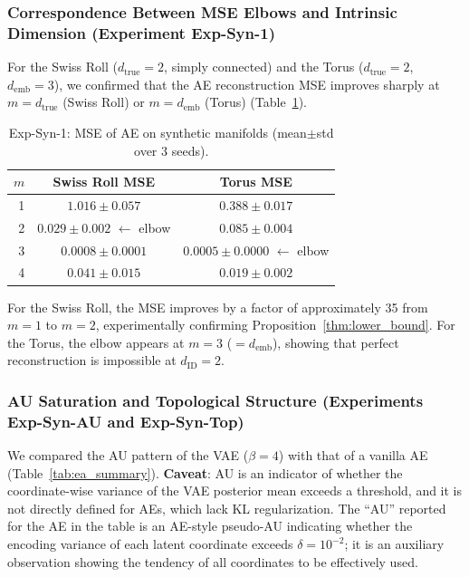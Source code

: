 \documentclass[make,article,submit,pdftex,moreauthors]{Definitions/mdpi}
\newcommand{\dID}{d_{\mathrm{ID}}}
\newcommand{\dtrue}{d_{\mathrm{true}}}
\newcommand{\demb}{d_{\mathrm{emb}}}
\begin{document}
\subsubsection{Correspondence Between MSE Elbows and Intrinsic Dimension (Experiment Exp-Syn-1)}

For the Swiss Roll ($\dtrue = 2$, simply connected) and the Torus ($\dtrue = 2$, $\demb = 3$),
we confirmed that the AE reconstruction MSE improves sharply at $m = \dtrue$ (Swiss Roll) or $m = \demb$ (Torus)
(Table~\ref{tab:e1}).

\begin{table}[H]
\centering
\caption{Exp-Syn-1: MSE of AE on synthetic manifolds (mean$\pm$std over 3 seeds).}
\label{tab:e1}
\small
\begin{tabular}{rcc}
\toprule
$m$ & Swiss Roll MSE & Torus MSE \\
\midrule
1 & $1.016\pm0.057$ & $0.388\pm0.017$ \\
2 & $\boldsymbol{0.029\pm0.002}$ $\leftarrow$ elbow & $0.085\pm0.004$ \\
3 & $0.0008\pm0.0001$ & $\boldsymbol{0.0005\pm0.0000}$ $\leftarrow$ elbow \\
4 & $0.041\pm0.015$ & $0.019\pm0.002$ \\
\bottomrule
\end{tabular}
\end{table}

For the Swiss Roll, the MSE improves by a factor of approximately 35 from $m = 1$ to $m = 2$,
experimentally confirming Proposition~\ref{thm:lower_bound}.
For the Torus, the elbow appears at $m = 3$ ($= \demb$),
showing that perfect reconstruction is impossible at $\dID = 2$.

\subsubsection{AU Saturation and Topological Structure (Experiments Exp-Syn-AU and Exp-Syn-Top)}

We compared the AU pattern of the VAE ($\beta = 4$) with that of a vanilla AE (Table~\ref{tab:ea_summary}).
\textbf{Caveat}: AU is an indicator of whether the coordinate-wise variance of the VAE posterior mean exceeds a threshold,
and it is not directly defined for AEs, which lack KL regularization.
The ``AU'' reported for the AE in the table is an AE-style pseudo-AU indicating whether
the encoding variance of each latent coordinate exceeds $\delta = 10^{-2}$;
it is an auxiliary observation showing the tendency of all coordinates to be effectively used.
\end{document}
